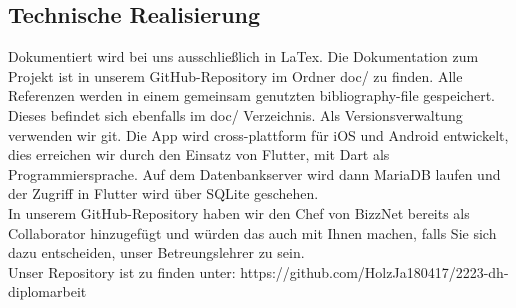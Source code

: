 \documentclass{article}
\begin{document}
\subsection{Technische Realisierung}
Dokumentiert wird bei uns ausschließlich in LaTex. Die Dokumentation zum Projekt ist in unserem GitHub-Repository im Ordner doc/ zu finden.
Alle Referenzen werden in einem gemeinsam genutzten bibliography-file gespeichert. Dieses befindet sich ebenfalls im doc/ Verzeichnis.
Als Versionsverwaltung verwenden wir git. Die App wird cross-plattform für iOS und Android entwickelt, dies erreichen wir durch den Einsatz von Flutter, mit Dart als Programmiersprache. Auf dem Datenbankserver wird dann MariaDB laufen und der Zugriff in Flutter wird über SQLite geschehen.\\
In unserem GitHub-Repository haben wir den Chef von BizzNet bereits als Collaborator hinzugefügt und würden das auch mit Ihnen machen, falls Sie sich dazu entscheiden, unser Betreungslehrer zu sein. \\
Unser Repository ist zu finden unter: https://github.com/HolzJa180417/2223-dh-diplomarbeit
\end{document}
